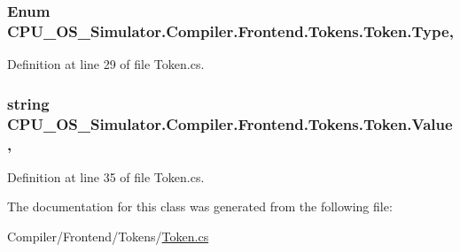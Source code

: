 \subsubsection[{Type}]{\setlength{\rightskip}{0pt plus 5cm}Enum C\+P\+U\+\_\+\+O\+S\+\_\+\+Simulator.\+Compiler.\+Frontend.\+Tokens.\+Token.\+Type\hspace{0.3cm}{\ttfamily [get]}, {\ttfamily [set]}}\label{class_c_p_u___o_s___simulator_1_1_compiler_1_1_frontend_1_1_tokens_1_1_token_a1735d21dd74ca2022d60b7ca45be3040}


Definition at line 29 of file Token.\+cs.

\hypertarget{class_c_p_u___o_s___simulator_1_1_compiler_1_1_frontend_1_1_tokens_1_1_token_ac2869f45f5d24226d03406c3f9da0505}{}
\subsubsection[{Value}]{\setlength{\rightskip}{0pt plus 5cm}string C\+P\+U\+\_\+\+O\+S\+\_\+\+Simulator.\+Compiler.\+Frontend.\+Tokens.\+Token.\+Value\hspace{0.3cm}{\ttfamily [get]}, {\ttfamily [set]}}\label{class_c_p_u___o_s___simulator_1_1_compiler_1_1_frontend_1_1_tokens_1_1_token_ac2869f45f5d24226d03406c3f9da0505}


Definition at line 35 of file Token.\+cs.



The documentation for this class was generated from the following file\+:\begin{DoxyCompactItemize}
\item 
Compiler/\+Frontend/\+Tokens/\hyperlink{_token_8cs}{Token.\+cs}\end{DoxyCompactItemize}
